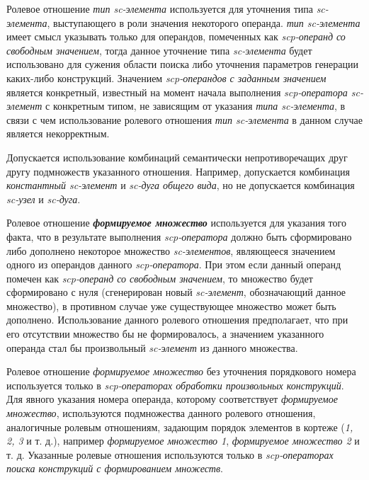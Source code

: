 Ролевое отношение \textit{тип \mbox{sc-элемента\scnrolesign}} используется для уточнения типа \textit{sc-элемента}, выступающего в роли значения некоторого операнда. \textit{тип \mbox{sc-элемента\scnrolesign}} имеет смысл указывать только для операндов, помеченных как \textit{scp-операнд со свободным значением\scnrolesign}, тогда данное уточнение типа \textit{\mbox{sc-элемента}} будет использовано для сужения области поиска либо уточнения параметров генерации каких-либо конструкций. Значением \textit{scp-операндов с заданным значением\scnrolesign} является конкретный, известный на момент начала выполнения \textit{scp-оператора sc-элемент} с конкретным типом, не зависящим от указания \textit{типа sc-элемента\scnrolesign}, в связи с чем использование ролевого отношения \textit{тип sc-элемента\scnrolesign} в данном случае является некорректным.

Допускается использование комбинаций семантически непротиворечащих друг другу подмножеств указанного отношения. Например, допускается комбинация \textit{константный sc-элемент\scnrolesign} и \textit{sc-дуга общего вида\scnrolesign}, но не допускается комбинация \textit{sc-узел\scnrolesign} и \textit{sc-дуга\scnrolesign}.

Ролевое отношение \textbf{\textit{формируемое множество\scnrolesign}} используется для указания того факта, что в результате выполнения \textit{scp-оператора} должно быть сформировано либо дополнено некоторое множество \textit{sc-элементов}, являющееся значением одного из операндов данного \textit{scp-оператора}. При этом если данный операнд помечен как \textit{scp-операнд со свободным значением\scnrolesign}, то множество будет сформировано с нуля (сгенерирован новый \textit{sc-элемент}, обозначающий данное множество), в противном случае уже существующее множество может быть дополнено. Использование данного ролевого отношения предполагает, что при его отсутствии множество бы не формировалось, а значением указанного операнда стал бы произвольный \textit{sc-элемент} из данного множества. 

Ролевое отношение \textit{формируемое множество\scnrolesign} без уточнения порядкового номера используется только в \textit{scp-операторах обработки произвольных конструкций}. Для явного указания номера операнда, которому соответствует \textit{формируемое множество\scnrolesign}, используются подмножества данного ролевого отношения, аналогичные ролевым отношениям, задающим порядок элементов в кортеже (\textit{1\scnrolesign, 2\scnrolesign, 3\scnrolesign} и т. д.), например \textit{формируемое множество 1\scnrolesign}, \textit{формируемое множество 2\scnrolesign} и т. д. Указанные ролевые отношения используются только в \textit{scp-операторах поиска конструкций с формированием множеств}.

